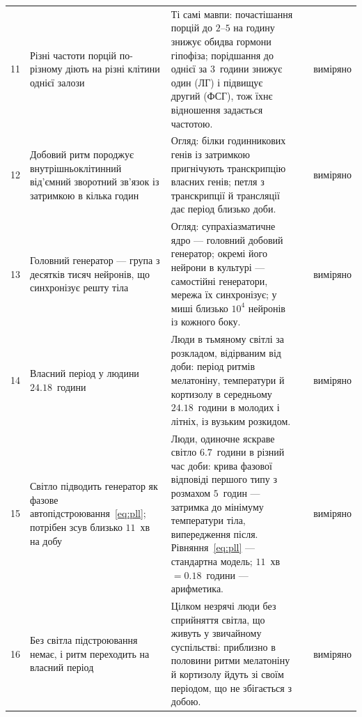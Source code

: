 {\begin{longtable}{>{\raggedright}p{0.5cm}>{\raggedright}p{4.0cm}>{\raggedright}p{5.6cm}>{\raggedright}p{2.3cm}>{\raggedright\arraybackslash}p{1.7cm}}
11 & Різні частоти порцій по-різному діють на різні клітини однієї залози & Ті самі мавпи: почастішання порцій до $2$--$5$ на годину знижує обидва гормони гіпофіза; порідшання до однієї за $3$~години знижує один (ЛГ) і підвищує другий (ФСГ), тож їхнє відношення задається частотою. & \cite{Wildt1981gnrh} & виміряно \\
12 & Добовий ритм породжує внутрішньоклітинний від'ємний зворотний зв'язок із затримкою в кілька годин & Огляд: білки годинникових генів із затримкою пригнічують транскрипцію власних генів; петля з транскрипції й трансляції дає період близько доби. & \cite{TakahashiJS2017} & виміряно \\
13 & Головний генератор --- група з десятків тисяч нейронів, що синхронізує решту тіла & Огляд: супрахіазматичне ядро --- головний добовий генератор; окремі його нейрони в культурі --- самостійні генератори, мережа їх синхронізує; у миші близько $10^4$ нейронів із кожного боку. & \cite{Welsh2010scn} & виміряно \\
14 & Власний період у людини $24.18$~години & Люди в тьмяному світлі за розкладом, відірваним від доби: період ритмів мелатоніну, температури й кортизолу в середньому $24.18$~години в молодих і літніх, із вузьким розкидом. & \cite{Czeisler1999} & виміряно \\
15 & Світло підводить генератор як фазове автопідстроювання~\eqref{eq:pll}; потрібен зсув близько $11$~хв на добу & Люди, одиночне яскраве світло $6.7$~години в різний час доби: крива фазової відповіді першого типу з розмахом $5$~годин --- затримка до мінімуму температури тіла, випередження після. Рівняння~\eqref{eq:pll} --- стандартна модель; $11$~хв $=0.18$~години --- арифметика. & \cite{Khalsa2003prc} & виміряно \\
16 & Без світла підстроювання немає, і ритм переходить на власний період & Цілком незрячі люди без сприйняття світла, що живуть у звичайному суспільстві: приблизно в половини ритми мелатоніну й кортизолу йдуть зі своїм періодом, що не збігається з добою. & \cite{Sack1992blind} & виміряно \\
\bottomrule
\end{longtable}}
